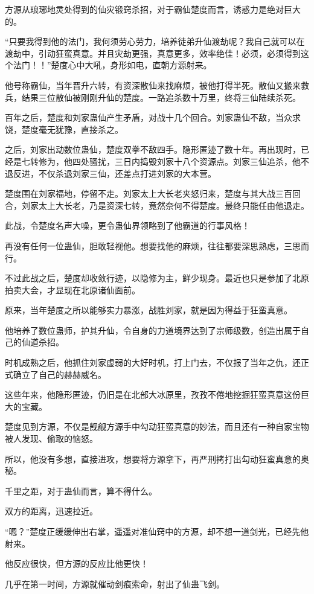 \begin{this_body}
方源从琅琊地灵处得到的仙灾锻窍杀招，对于霸仙楚度而言，诱惑力是绝对巨大的。

“只要我得到他的法门，我何须劳心劳力，培养徒弟升仙渡劫呢？我自己就可以在渡劫中，引动狂蛮真意。并且灾劫更强，真意更多，效率绝佳！必须，必须得到这个法门！！”楚度心中大吼，身形如电，直朝方源射来。

他号称霸仙，当年晋升六转，有资深散仙来找麻烦，被他打得半死。散仙又搬来救兵，结果三位散仙被刚刚升仙的楚度。一路追杀数十万里，终将三仙陆续杀死。

百年之后，楚度和刘家蛊仙产生矛盾，对战十几个回合。刘家蛊仙不敌，当众求饶，楚度毫无犹豫，直接杀之。

之后，刘家出动数位蛊仙，楚度双拳不敌四手。隐形匿迹了数十年。再出现时，已经是七转修为，他四处骚扰，三日内捣毁刘家十八个资源点。刘家三仙追杀，他不退反进，不仅杀退刘家三仙，还差点打进刘家的大本营。

楚度围在刘家福地，停留不走。刘家太上大长老夹怒归来，楚度与其大战三百回合，刘家太上大长老，乃是资深七转，竟然奈何不得楚度。最终只能任由他退走。

此战，令楚度名声大噪，更令蛊仙界领略到了他霸道的行事风格！

再没有任何一位蛊仙，胆敢轻视他。想要找他的麻烦，往往都要深思熟虑，三思而行。

不过此战之后，楚度却收敛行迹，以隐修为主，鲜少现身。最近也只是参加了北原拍卖大会，才显现在北原诸仙面前。

原来，当年楚度之所以能够实力暴涨，战胜刘家，就是因为得益于狂蛮真意。

他培养了数位蛊师，护其升仙，令自身的力道境界达到了宗师级数，创造出属于自己的仙道杀招。

时机成熟之后，他抓住刘家虚弱的大好时机，打上门去，不仅报了当年之仇，还正式确立了自己的赫赫威名。

这些年来，他隐形匿迹，仍旧是在北部大冰原里，孜孜不倦地挖掘狂蛮真意这份巨大的宝藏。

楚度见到方源，不仅是觊觎方源手中勾动狂蛮真意的妙法，而且还有一种自家宝物被人发现、偷取的恼怒。

所以，他没有多想，直接进攻，想要将方源拿下，再严刑拷打出勾动狂蛮真意的奥秘。

千里之距，对于蛊仙而言，算不得什么。

双方的距离，迅速拉近。

“嗯？”楚度正缓缓伸出右掌，遥遥对准仙窍中的方源，却不想一道剑光，已经先他射来。

他反应很快，但方源的反应比他更快！

几乎在第一时间，方源就催动剑痕索命，射出了仙蛊飞剑。


\end{this_body}
